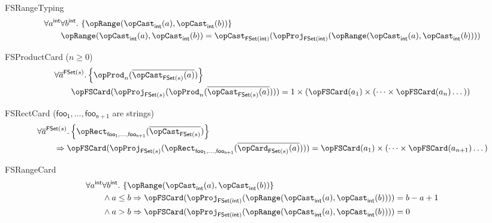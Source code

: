 \documentclass[11pt, a4paper, oneside]{article}
\begin{document}
\begin{axioms}
\item[FSRangeTyping] \[
        \begin{aligned}
            &\forall a^\int \forall b^\int.\, \st{ \opRange(\opCast_\int(a), \opCast_\int(b)) } \\
            &\qquad \opRange(\opCast_\int(a), \opCast_\int(b)) = \opCast_{\FSet(\int)}(\opProj_{\FSet(\int)}(\opRange(\opCast_\int(a), \opCast_\int(b))))
        \end{aligned}
    \]

\item[FSProductCard ($n \ge 0$)] \[
        \begin{aligned}
            &\forall \overline{a}^{\FSet(s)}. \st{ \opProd_n(\overline{\opCast_{\FSet(s)}(a)}) } \\
            &\qquad \opFSCard(\opProj_{\FSet(s)}(\opProd_n(\overline{\opCast_{\FSet(s)}(a)}))) = 1 \times (\opFSCard(a_1) \times (\dots \times \opFSCard(a_n) \dots))
        \end{aligned}
    \]

\item[FSRectCard (\rm$\mathsf{foo_1},\dots,\mathsf{foo_{n+1}}$ are strings)] \[
        \begin{aligned}
            &\forall \overline{a}^{\FSet(s)}. \st{ \opRect_{\mathsf{foo_1}, \dots, \mathsf{foo_{n+1}}}(\overline{\opCast_{\FSet(s)}}) } \\
            &\qquad \imp \opFSCard(\opProj_{\FSet(s)}(\opRect_{\mathsf{foo_1}, \dots, \mathsf{foo_{n+1}}}(\overline{\opCard_{\FSet(s)}(a)}))) = \opFSCard(a_1) \times (\dots \times \opFSCard(a_{n+1}) \dots)
        \end{aligned}
    \]

\item[FSRangeCard] \[
        \begin{aligned}
            &\forall a^\int \forall b^\int.\, \st{ \opRange(\opCast_\int(a), \opCast_\int(b)) } \\
            &\qquad \begin{aligned}[t]
                &\wedge a \le b \imp \opFSCard(\opProj_{\FSet(\int)}(\opRange(\opCast_\int(a), \opCast_\int(b)))) = b - a + 1 \\
                &\wedge a > b \imp \opFSCard(\opProj_{\FSet(\int)}(\opRange(\opCast_\int(a), \opCast_\int(b)))) = 0
            \end{aligned}
        \end{aligned}
    \]

\end{axioms}
\end{document}
